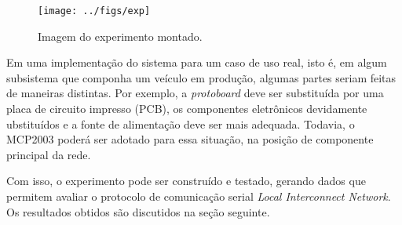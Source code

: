 \begin{figure}[H]
    \centering
    \texttt{[image: ../figs/exp]}
    \caption{Imagem do experimento montado.}
    \label{fig:exp}
\end{figure}

Em uma implementação do sistema para um caso de uso real, isto é, em algum subsistema que componha um veículo em produção, algumas partes seriam feitas de maneiras distintas. Por exemplo, a \textit{protoboard} deve ser substituída por uma placa de circuito impresso (PCB), os componentes eletrônicos devidamente ubstituídos e a fonte de alimentação deve ser mais adequada. Todavia, o MCP2003 \cite{datasheet:mcp2003} poderá ser adotado para essa situação, na posição de componente principal da rede.

Com isso, o experimento pode ser construído e testado, gerando dados que permitem avaliar o protocolo de comunicação serial \textit{Local Interconnect Network}. Os resultados obtidos são discutidos na seção seguinte.

